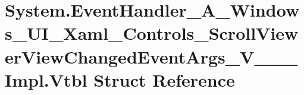 \hypertarget{struct_system_1_1_event_handler___a___windows___u_i___xaml___controls___scroll_viewer_view_changd9b2e3e9495d0e3c92d7a0d6cea8508d}{}\section{System.\+Event\+Handler\+\_\+\+A\+\_\+\+Windows\+\_\+\+U\+I\+\_\+\+Xaml\+\_\+\+Controls\+\_\+\+Scroll\+Viewer\+View\+Changed\+Event\+Args\+\_\+\+V\+\_\+\+\_\+\+\_\+\+Impl.\+Vtbl Struct Reference}
\label{struct_system_1_1_event_handler___a___windows___u_i___xaml___controls___scroll_viewer_view_changd9b2e3e9495d0e3c92d7a0d6cea8508d}
